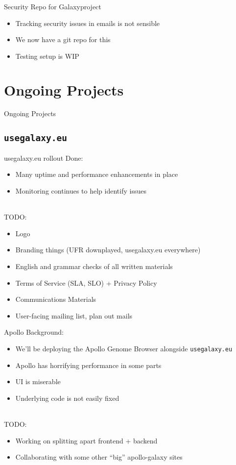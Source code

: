 \documentclass[12pt]{ufrslides}
\begin{document}
	\begin{frame}{Security Repo for Galaxyproject}
		\begin{itemize}
			\item Tracking security issues in emails is not sensible
			\item We now have a git repo for this
			\item Testing setup is WIP
		\end{itemize}
	\end{frame}


\section[Ongoing]{Ongoing Projects}
\begin{frame}{Ongoing Projects}
\end{frame}

\subsection[FR Galaxy]{\texttt{usegalaxy.eu}}

	\begin{frame}{usegalaxy.eu rollout}
		Done:
		\begin{itemize}
			\item Many uptime and performance enhancements in place
			\item Monitoring continues to help identify issues
		\end{itemize}
		\ \\[0.5cm]
		TODO:
		\begin{itemize}
			\item Logo
			\item Branding things (UFR downplayed, usegalaxy.eu everywhere)
			\item English and grammar checks of all written materials
			\item Terms of Service (SLA, SLO) + Privacy Policy
			\item Communications Materials
			\item User-facing mailing list, plan out mails
		\end{itemize}
	\end{frame}

	\begin{frame}{Apollo}
		Background:
		\begin{itemize}
			\item We'll be deploying the Apollo Genome Browser alongside \texttt{usegalaxy.eu}
			\item Apollo has horrifying performance in some parts
			\item UI is miserable
			\item Underlying code is not easily fixed
		\end{itemize}
		\ \\[0.5cm]
		TODO:
		\begin{itemize}
			\item Working on splitting apart frontend + backend
			\item Collaborating with some other ``big'' apollo-galaxy sites
		\end{itemize}
	\end{frame}
\end{document}
